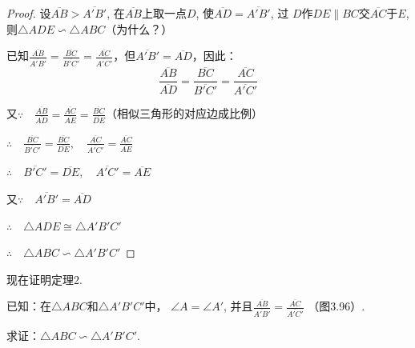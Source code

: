 \begin{proof}
    设$\overline{AB}>\overline{A'B'}$, 在$\overline{AB}$上取一点$D$, 使$\overline{AD}=\overline{A'B'}$, 过
$D$作$DE\parallel BC$交$\overline{AC}$于$E$, 则$\triangle ADE\backsim \triangle ABC$（为什么？）

已知$\frac{\overline{AB}}{\overline{A'B'}}=\frac{\overline{BC}}{\overline{B'C'}}=\frac{\overline{AC}}{\overline{A'C'}}$，但$\overline{A'B'}=\overline{AD}$，因此：
\[\frac{\overline{AB}}{\overline{AD}}=\frac{\overline{BC}}{\overline{B'C'}}=\frac{\overline{AC}}{\overline{A'C'}}\]

又$\because\quad \frac{\overline{AB}}{\overline{AD}}=\frac{\overline{AC}}{\overline{AE}}=\frac{\overline{BC}}{\overline{DE}}$（相似三角形的对应边成比例）

$\therefore\quad  \frac{\overline{BC}}{\overline{B'C'}}=\frac{\overline{BC}}{\overline{DE}},\quad \frac{\overline{AC}}{\overline{A'C'}}=\frac{\overline{AC}}{\overline{AE}}$

$\therefore\quad \overline{B'C'}=\overline{DE},\quad \overline{A'C'}=\overline{AE}$

又$\because\quad \overline{A'B'}=\overline{AD}$

$\therefore\quad \triangle ADE\cong \triangle A'B'C'$

$\therefore\quad \triangle ABC\backsim \triangle A'B'C'$
\end{proof}

现在证明定理2.

已知：在$\triangle ABC$和$\triangle A'B'C'$中，
$\angle A=\angle A'$, 并且$\frac{\overline{AB}}{\overline{A'B'}}=\frac{\overline{AC}}{\overline{A'C'}}$
（图3.96）.

求证：$\triangle ABC\backsim \triangle A'B'C'$.

\begin{figure}[htp]
    \centering
{}
    \caption{}
\end{figure}

